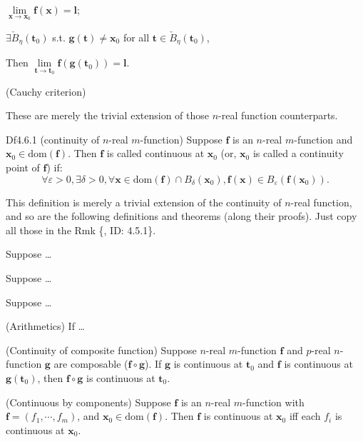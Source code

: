\documentclass{article}
\begin{document}
\begin{Rmk}{}
{\begin{compactenum}
\begin{compactenum}
            \item $\lim\limits_{\pmb{x}\to\pmb{x}_0} \pmb{f}(\pmb{x}) = \pmb{l}$;
            \item $\exists \check{B}_\eta(\pmb{t}_0)$ s.t. $\pmb{g}(\pmb{t})\neq \pmb{x}_0$ for all $\pmb{t}\in\check{B}_\eta(\pmb{t}_0)$,
        \end{compactenum}
        Then $\lim\limits_{\pmb{t}\to\pmb{t}_0} \pmb{f}(\pmb{g}(\pmb{t}_0)) = \pmb{l}$.
        \item (Cauchy criterion) 
    \end{compactenum}}
    These are merely the trivial extension of those $n$-real function counterparts.
\end{Rmk}

\begin{Df}{Df4.6.1 (continuity of $n$-real $m$-function)}
    Suppose $\pmb{f}$ is an $n$-real $m$-function and $\pmb{x}_0\in\text{dom}(\pmb{f})$. Then $\pmb{f}$ is called continuous at $\pmb{x}_0$ (or, $\pmb{x}_0$ is called a continuity point of $\pmb{f}$) if:
    $$\forall\varepsilon>0, \exists\delta>0, \forall \pmb{x}\in\text{dom}(\pmb{f})\cap B_\delta(\pmb{x}_0), \pmb{f}(\pmb{x})\in B_\varepsilon(\pmb{f}(\pmb{x}_0)).$$
\end{Df}

\begin{Rmk}{}
    This definition is merely a trivial extension of the continuity of $n$-real function, and so are the following definitions and theorems (along their proofs). Just copy all those in the Rmk \{, ID: 4.5.1\}.
    \begin{compactenum}
        \item \textcolor{Df}{Suppose \dots}
        \item \textcolor{Th}{Suppose \dots}
        \item \textcolor{Th}{Suppose \dots}
        \item \textcolor{Th}{(Arithmetics) If \dots}
        \item \textcolor{Th}{(Continuity of composite function) Suppose $n$-real $m$-function $\pmb{f}$ and $p$-real $n$-function $\pmb{g}$ are composable ($\pmb{f}\circ\pmb{g}$). If $\pmb{g}$ is continuous at $\pmb{t}_0$ and $\pmb{f}$ is continuous at $\pmb{g}(\pmb{t}_0)$, then $\pmb{f}\circ\pmb{g}$ is continuous at $\pmb{t}_0$.}
        \item \textcolor{Th}{(Continuous by components) Suppose $\pmb{f}$ is an $n$-real $m$-function with $\pmb{f} = (f_1, \cdots, f_m)$, and $\pmb{x}_0\in\text{dom}(\pmb{f})$. Then $\pmb{f}$ is continuous at $\pmb{x}_0$ iff each $f_i$ is continuous at $\pmb{x}_0$.}
    \end{compactenum}
\end{Rmk}
\end{document}
